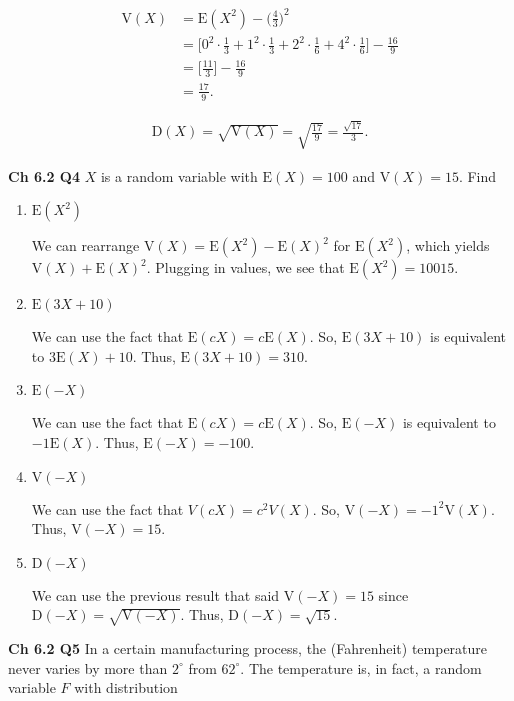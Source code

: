 \documentclass[12pt]{article}
\newcommand{\nspace}{\vspace*{.5cm}}
\newcommand{\nline}{\nspace \noindent}
\newcommand{\expected}[1]{\text{E}(#1)}
\begin{document}
\begin{align*}
\text{V}(X) &= \text{E}(X^2) - \Big ( \frac{4}{3} \Big )^2 \\
&= \Big [ 0^2 \cdot \frac{1}{3} + 1^2 \cdot \frac{1}{3} + 2^2 \cdot \frac{1}{6} + 4^2 \cdot \frac{1}{6} \Big ] - \frac{16}{9} \\
&= \Big [ \frac{11}{3} \Big ] - \frac{16}{9} \\
&= \frac{17}{9}.
\end{align*}

\begin{align*}
\text{D}(X) = \sqrt{\text{V}(X)} = \sqrt{\frac{17}{9}} = \frac{\sqrt{17}}{3}.
\end{align*}

\nline
\textbf{Ch 6.2 Q4} $X$ is a random variable with $\text{E}(X) = 100$ and $\text{V}(X) = 15$. Find

\begin{enumerate}[label=(\alph*)]
\item $\expected{X^2}$

\nline
We can rearrange $\text{V}(X) = \text{E}(X^2) - \text{E}(X)^2$ for $\text{E}(X^2)$, which yields $\text{V}(X) + \text{E}(X)^2$. Plugging in values, we see that $\expected{X^2} = 10015$.

\item $\expected{3X + 10}$

\nline
We can use the fact that $\expected{cX} = c \expected{X}$. So, $\expected{3X + 10}$ is equivalent to $3 \expected{X} + 10$. Thus, $\expected{3X + 10} = 310$. 

\item $\expected{-X}$

\nline
We can use the fact that $\expected{cX} = c \expected{X}$. So, $\expected{-X}$ is equivalent to $-1 \expected{X}$. Thus, $\expected{-X} = -100$. 

\item $\text{V}(-X)$

\nline
We can use the fact that $V(cX) = c^2 V(X)$. So, $\text{V}(-X) = -1^2 \text{V}(X)$. Thus,  $\text{V}(-X) = 15$.

\item $\text{D}(-X)$

\nline
We can use the previous result that said $\text{V}(-X) = 15$ since $\text{D}(-X) = \sqrt{\text{V}(-X)}$. Thus, $\text{D}(-X) = \sqrt{15}$.

\end{enumerate}

\nline
\textbf{Ch 6.2 Q5} In a certain manufacturing process, the (Fahrenheit) temperature never varies by more than $2^{\circ}$ from $62^{\circ}$. The temperature is, in fact, a random variable $F$ with distribution
\end{document}
